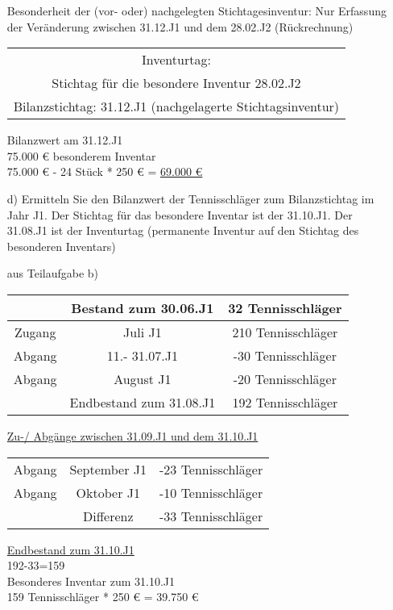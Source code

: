 \documentclass[paper=a4, fontsize=11pt]{scrartcl}
\numberwithin{equation}{section}
\numberwithin{figure}{section}
\numberwithin{table}{section}
\begin{document}
\begin{itemize}
Besonderheit der (vor- oder) nachgelegten Stichtagesinventur: Nur Erfassung der Veränderung zwischen 31.12.J1 und dem 28.02.J2 (Rückrechnung) \\

\begin{tabular}{|c|}
\hline
Inventurtag: \\
Stichtag für die besondere Inventur 28.02.J2 \\
Bilanzstichtag: 31.12.J1 (nachgelagerte Stichtagsinventur) \\
\hline
\end{tabular}

Bilanzwert am 31.12.J1 \\
75.000 € besonderem Inventar \\
75.000 € - 24 Stück * 250 € = \underline{69.000 €} \\

\item[d)] Ermitteln Sie den Bilanzwert der Tennisschläger zum Bilanzstichtag im Jahr J1. Der Stichtag für das besondere Inventar ist der 31.10.J1. Der 31.08.J1 ist der Inventurtag (permanente Inventur auf den Stichtag des besonderen Inventars)

aus Teilaufgabe b) \\
\begin{tabular}{|c|c|c|}
\hline
 & Bestand zum 30.06.J1 & 32 Tennisschläger \\\hline
 Zugang & Juli J1 & 210 Tennisschläger \\
 Abgang & 11.- 31.07.J1 & -30 Tennisschläger \\
 Abgang & August J1 & -20 Tennisschläger \\\hline
 & Endbestand zum 31.08.J1 & 192 Tennisschläger \\\hline
\end{tabular}

\underline{Zu-/ Abgänge zwischen 31.09.J1 und dem 31.10.J1} \\
\begin{tabular}{cc|c}
Abgang & September J1 & -23 Tennisschläger \\
Abgang & Oktober J1 & -10 Tennisschläger \\\hline
 & Differenz & -33 Tennisschläger \\
\end{tabular}

\underline{Endbestand zum 31.10.J1} \\
192-33=159 \\
Besonderes Inventar zum 31.10.J1 \\
159 Tennisschläger * 250 € = 39.750 € \\


\end{itemize}
\end{document}

